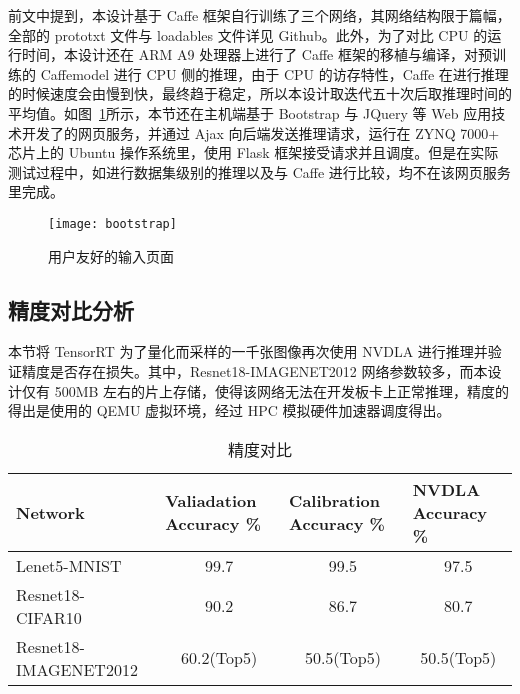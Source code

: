 前文中提到，本设计基于 Caffe 框架自行训练了三个网络，其网络结构限于篇幅，全部的 prototxt 文件与 loadables 文件详见 Github\cite{nvdla_loadables}。此外，为了对比 CPU 的运行时间，本设计还在 ARM A9 处理器上进行了 Caffe 框架的移植与编译，对预训练的 Caffemodel 进行 CPU 侧的推理，由于 CPU 的访存特性，Caffe 在进行推理的时候速度会由慢到快，最终趋于稳定，所以本设计取迭代五十次后取推理时间的平均值。如图~\ref{fig:BootStrap}所示，本节还在主机端基于 Bootstrap 与 JQuery 等 Web 应用技术开发了的网页服务，并通过 Ajax 向后端发送推理请求，运行在 ZYNQ 7000+ 芯片上的 Ubuntu 操作系统里，使用 Flask 框架接受请求并且调度。但是在实际测试过程中，如进行数据集级别的推理以及与 Caffe 进行比较，均不在该网页服务里完成。

\begin{figure}[!htbp]
    \centering
    \texttt{[image: bootstrap]}
    \caption{用户友好的输入页面}
    \label{fig:BootStrap}
\end{figure}

\subsection{精度对比分析}

本节将 TensorRT 为了量化而采样的一千张图像再次使用 NVDLA 进行推理并验证精度是否存在损失。其中，Resnet18-IMAGENET2012 网络参数较多，而本设计仅有 500MB 左右的片上存储，使得该网络无法在开发板卡上正常推理，精度的得出是使用的 QEMU 虚拟环境，经过 HPC 模拟硬件加速器调度得出。

\begin{table}[!htbp]
    \caption{精度对比}
    \label{tab:Qualifications Report}
    \centering
    \footnotesize%
    \setlength{\tabcolsep}{4pt}%
    \renewcommand{\arraystretch}{1.2}%
    \begin{tabular}{lccc}
        \toprule
        \textbf{Network}      & \multicolumn{1}{l}{\textbf{Valiadation Accuracy \%}} & \multicolumn{1}{l}{\textbf{Calibration Accuracy \%}}  & \multicolumn{1}{l}{\textbf{NVDLA Accuracy \%}} \\
        \midrule
        Lenet5-MNIST          & 99.7                                                 & 99.5                                                 & 97.5                                                 \\  
        Resnet18-CIFAR10      & 90.2                                                 & 86.7                                                 & 80.7                                                 \\
        Resnet18-IMAGENET2012 & 60.2(Top5)                                           & 50.5(Top5)                                           & 50.5(Top5)                                           \\
        \bottomrule                   
    \end{tabular}
\end{table}

